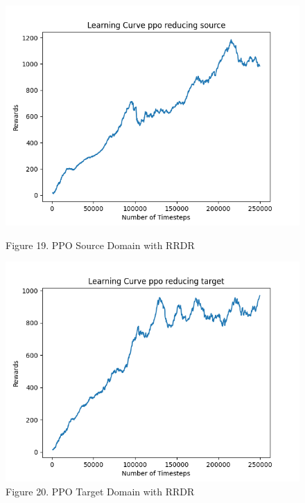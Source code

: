 \documentclass[12pt]{article}
\begin{document}
\begin{figure}[H]
    \vfill
    \begin{minipage}{0.45\textwidth}
        \centering
        \includegraphics[width=\textwidth]{../images/Learning_curve_PPO_reducing_Source.png}
        \caption{Figure 19. PPO Source Domain with RRDR}
        \label{fig:ppo_source_rrdr}
    \end{minipage}
    \hfill
    \begin{minipage}{0.45\textwidth}
        \centering
        \includegraphics[width=\textwidth]{../images/Learning_curve_PPO_reducing_Target.png}
        \caption{Figure 20. PPO Target Domain with RRDR}
        \label{fig:ppo_target_rrdr}
    \end{minipage}

\end{figure}
\end{document}
